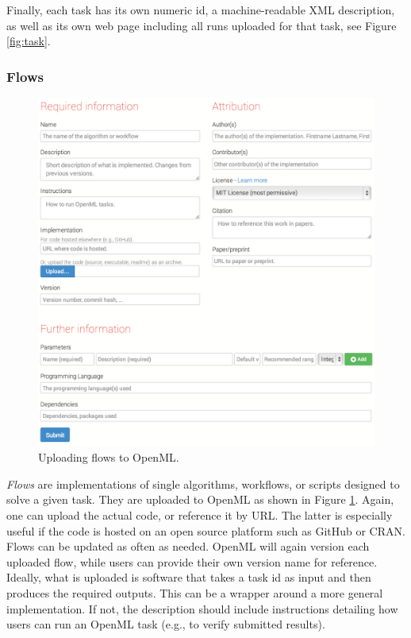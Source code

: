 \documentclass{acmproc-sp}
\begin{document}
Finally, each task has its own numeric id, a machine-readable XML description, as well as its own web page including all runs uploaded for that task, see Figure \ref{fig:task}.

\subsubsection{Flows}
\begin{figure}
\centering
\includegraphics[width=\columnwidth]{openml-flows.png}
\caption{\label{fig:flows}Uploading flows to OpenML.}
\end{figure}

\textit{Flows} are implementations of single algorithms, workflows, or scripts designed to solve a given task. They are uploaded to OpenML as shown in Figure \ref{fig:flows}. Again, one can upload the actual code, or reference it by URL. The latter is especially useful if the code is hosted on an open source platform such as GitHub or CRAN. Flows can be updated as often as needed. OpenML will again version each uploaded flow, while users can provide their own version name for reference. Ideally, what is uploaded is software that takes a task id as input and then produces the required outputs. This can be a wrapper around a more general implementation. If not, the description should include instructions detailing how users can run an OpenML task (e.g., to verify submitted results).
\end{document}
